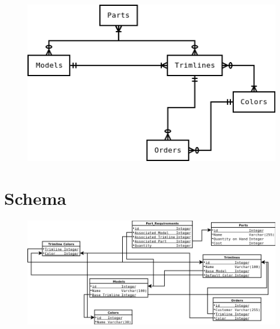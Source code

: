 \documentclass[11pt,letterpaper,oneside]{amsart}
\begin{document}
\begin{figure}[H]
	\centerline{\includegraphics[scale=1.2]{erddraft.png}}
\end{figure}

\section*{Schema}

\begin{figure}[H]
	\centerline{\includegraphics[scale=.6]{schema6.png}}
\end{figure}
\end{document}
